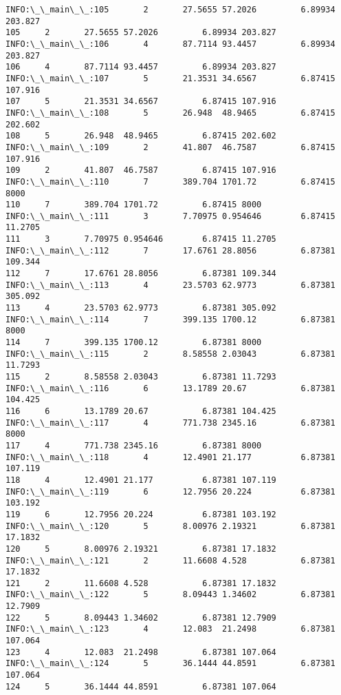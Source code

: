 \documentclass[11pt]{article}
\begin{document}
\begin{Verbatim}[commandchars=\\\{\}]
INFO:\_\_main\_\_:105       2       27.5655 57.2026         6.89934 203.827
105     2       27.5655 57.2026         6.89934 203.827
INFO:\_\_main\_\_:106       4       87.7114 93.4457         6.89934 203.827
106     4       87.7114 93.4457         6.89934 203.827
INFO:\_\_main\_\_:107       5       21.3531 34.6567         6.87415 107.916
107     5       21.3531 34.6567         6.87415 107.916
INFO:\_\_main\_\_:108       5       26.948  48.9465         6.87415 202.602
108     5       26.948  48.9465         6.87415 202.602
INFO:\_\_main\_\_:109       2       41.807  46.7587         6.87415 107.916
109     2       41.807  46.7587         6.87415 107.916
INFO:\_\_main\_\_:110       7       389.704 1701.72         6.87415 8000
110     7       389.704 1701.72         6.87415 8000
INFO:\_\_main\_\_:111       3       7.70975 0.954646        6.87415 11.2705
111     3       7.70975 0.954646        6.87415 11.2705
INFO:\_\_main\_\_:112       7       17.6761 28.8056         6.87381 109.344
112     7       17.6761 28.8056         6.87381 109.344
INFO:\_\_main\_\_:113       4       23.5703 62.9773         6.87381 305.092
113     4       23.5703 62.9773         6.87381 305.092
INFO:\_\_main\_\_:114       7       399.135 1700.12         6.87381 8000
114     7       399.135 1700.12         6.87381 8000
INFO:\_\_main\_\_:115       2       8.58558 2.03043         6.87381 11.7293
115     2       8.58558 2.03043         6.87381 11.7293
INFO:\_\_main\_\_:116       6       13.1789 20.67           6.87381 104.425
116     6       13.1789 20.67           6.87381 104.425
INFO:\_\_main\_\_:117       4       771.738 2345.16         6.87381 8000
117     4       771.738 2345.16         6.87381 8000
INFO:\_\_main\_\_:118       4       12.4901 21.177          6.87381 107.119
118     4       12.4901 21.177          6.87381 107.119
INFO:\_\_main\_\_:119       6       12.7956 20.224          6.87381 103.192
119     6       12.7956 20.224          6.87381 103.192
INFO:\_\_main\_\_:120       5       8.00976 2.19321         6.87381 17.1832
120     5       8.00976 2.19321         6.87381 17.1832
INFO:\_\_main\_\_:121       2       11.6608 4.528           6.87381 17.1832
121     2       11.6608 4.528           6.87381 17.1832
INFO:\_\_main\_\_:122       5       8.09443 1.34602         6.87381 12.7909
122     5       8.09443 1.34602         6.87381 12.7909
INFO:\_\_main\_\_:123       4       12.083  21.2498         6.87381 107.064
123     4       12.083  21.2498         6.87381 107.064
INFO:\_\_main\_\_:124       5       36.1444 44.8591         6.87381 107.064
124     5       36.1444 44.8591         6.87381 107.064

\end{Verbatim}
\end{document}
